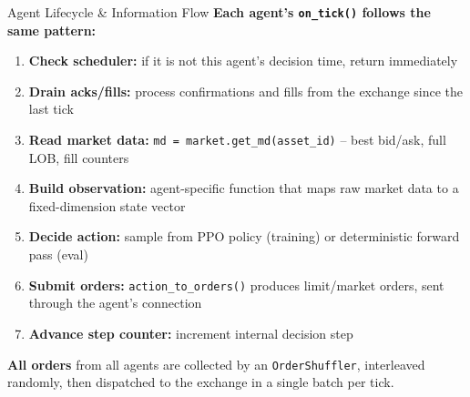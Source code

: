 \documentclass[10pt,aspectratio=169]{beamer}
\begin{document}
\begin{frame}{Agent Lifecycle \& Information Flow}
  \textbf{Each agent's \texttt{on\_tick()} follows the same pattern:}

  \vspace{6pt}
  \begin{enumerate}
    \item \textbf{Check scheduler:} if it is not this agent's decision time, return immediately
    \item \textbf{Drain acks/fills:} process confirmations and fills from the exchange since the last tick
    \item \textbf{Read market data:} \texttt{md = market.get\_md(asset\_id)} -- best bid/ask, full LOB, fill counters
    \item \textbf{Build observation:} agent-specific function that maps raw market data to a fixed-dimension state vector
    \item \textbf{Decide action:} sample from PPO policy (training) or deterministic forward pass (eval)
    \item \textbf{Submit orders:} \texttt{action\_to\_orders()} produces limit/market orders, sent through the agent's connection
    \item \textbf{Advance step counter:} increment internal decision step
  \end{enumerate}

  \vspace{6pt}
  \textbf{All orders} from all agents are collected by an \texttt{OrderShuffler}, interleaved randomly, then dispatched to the exchange in a single batch per tick.
\end{frame}
\end{document}
